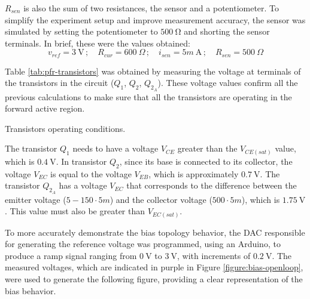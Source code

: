 $R_{sen}$ is also the sum of two resistances, the sensor and a potentiometer. To simplify the experiment setup and improve measurement accuracy, the sensor was simulated by setting the potentiometer to $\mathrm{500~\Omega}$ and shorting the sensor terminals. In brief, these were the values obtained:
\begin{equation}
    \nonumber v_{ref} = 3~\mathrm{V}\,; \quad R_{cur} = 600~\Omega \,;
    \quad i_{sen} = 5m~\mathrm{A}\,; \quad R_{sen} = 500~\Omega
\end{equation}

Table \ref{tab:pfr-transistors} was obtained by measuring the voltage at terminals of the transistors in the circuit ($Q_1$, $Q_2$, $Q_{2_A}$). These voltage values confirm all the previous calculations to make sure that all the transistors are operating in the forward active region. 

\begin{table}[ht]
    \centering
    \caption{Transistors operating conditions.}
    \begin{small}
    
    \end{small}
    \label{tab:pfr-transistors}
\end{table}

\noindent
The transistor $Q_1$ needs to have a voltage $V_{CE}$ greater than the $V_{CE(sat)}$ value, which is $\mathrm{0.4~V}$. In transistor $Q_2$, since its base is connected to its collector, the voltage $V_{EC}$ is equal to the voltage $V_{EB}$, which is approximately $\mathrm{0.7~V}$. The transistor $Q_{2_A}$ has a voltage $V_{EC}$ that corresponds to the difference between the emitter voltage ($5 - 150 \cdot 5m$) and the collector voltage ($500 \cdot 5m$), which is $\mathrm{1.75~V}$. This value must also be greater than $V_{EC(sat)}$.

To more accurately demonstrate the bias topology behavior, the \ac{DAC} responsible for generating the reference voltage was programmed, using an Arduino, to produce a ramp signal ranging from $\mathrm{0~V}$ to $\mathrm{3~V}$, with increments of $\mathrm{0.2~V}$. The measured voltages, which are indicated in purple in Figure \ref{figure:bias-openloop}, were used to generate the following figure, providing a clear representation of the bias behavior.


